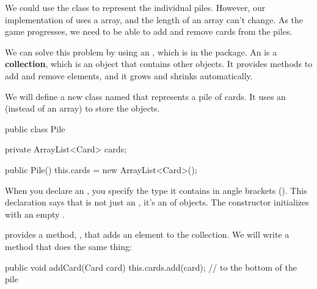 We could use the  class to represent the individual piles.
However, our implementation of  uses a  array, and the length of an array can't change.
As the game progresses, we need to be able to add and remove cards from the piles.


We can solve this problem by using an , which is in the  package.
An  is a {\bf collection}, which is an object that contains other objects.
It provides methods to add and remove elements, and it grows and shrinks automatically.


We will define a new class named  that represents a pile of cards.
It uses an  (instead of an array) to store the  objects.

\begin{code}
public class Pile {
    private ArrayList<Card> cards;

    public Pile() {
        this.cards = new ArrayList<Card>();
    }
}
\end{code}


When you declare an , you specify the type it contains in angle brackets (\java{<>}).
This declaration says that  is not just an , it's an  of  objects.
The constructor initializes  with an empty .


 provides a method, , that adds an element to the collection.
We will write a  method that does the same thing:

\begin{code}
public void addCard(Card card) {
    this.cards.add(card);        // to the bottom of the pile
}
\end{code}


